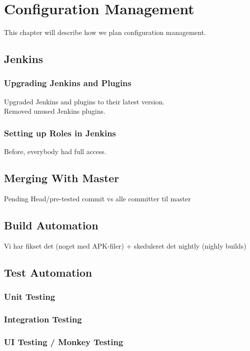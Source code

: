 \chapter{Configuration Management}%
This chapter will describe how we plan configuration management.

\section{Jenkins}


\subsection{Upgrading Jenkins and Plugins}
Upgraded Jenkins and plugins to their latest version.\\
Removed unused Jenkins plugins.

\subsection{Setting up Roles in Jenkins}
Before, everybody had full access.

\section{Merging With Master}
Pending Head/pre-tested commit vs alle committer til master

\section{Build Automation}
Vi har fikset det (noget med APK-filer) + skeduleret det nightly (nighly builds)

\section{Test Automation}
\subsection{Unit Testing}
\subsection{Integration Testing}
\subsection{UI Testing / Monkey Testing}
